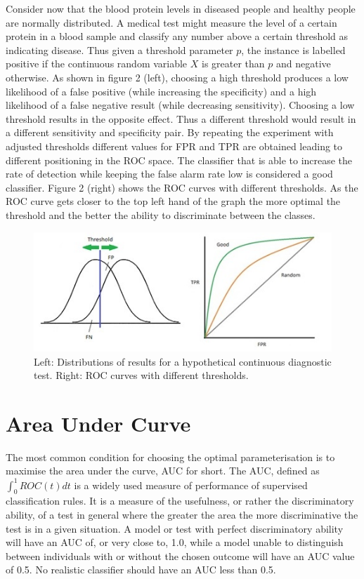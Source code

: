 Consider now that the blood protein levels in diseased people and healthy people are normally distributed. A medical test might measure the level of a certain protein in a blood sample and classify any number above a certain threshold as indicating disease. Thus given a threshold parameter $p$, the instance is labelled positive if the continuous random variable $X$ is greater than $p$ and negative otherwise. As shown in figure 2 (left), choosing a high threshold produces a low likelihood of a false positive (while increasing the specificity) and a high likelihood of a false negative result (while decreasing sensitivity). Choosing a low threshold results in the opposite effect. Thus a different threshold would result in a different sensitivity and specificity pair. By repeating the experiment with adjusted thresholds different values for FPR and TPR are obtained leading to different positioning in the ROC space. The classifier that is able to increase the rate of detection while keeping the false alarm rate low is considered a good classifier. Figure 2 (right) shows the ROC curves with different thresholds. As the ROC curve gets closer to the top left hand of the graph the more optimal the threshold and the better the ability to discriminate between the classes.

\begin{figure}
	\includegraphics{roc_curves/Figure2.png}
	\caption{Left: Distributions of results for a hypothetical continuous diagnostic test. Right: ROC curves with different thresholds.}
	\label{fig:roc-curves}
\end{figure}

\section{Area Under Curve} 
The most common condition for choosing the optimal parameterisation is to maximise the area under the curve, AUC for short. The AUC, defined as $\int_{0}^{1} ROC(t) dt$ is a widely used measure of performance of supervised classification rules. It is a measure of the usefulness, or rather the discriminatory ability, of a test in general where the greater the area the more discriminative the test is in a given situation. A model or test with perfect discriminatory ability will have an AUC of, or very close to, 1.0, while a model unable to distinguish between individuals with or without the chosen outcome will have an AUC value of 0.5.  No realistic classifier should have an AUC less than 0.5. 

